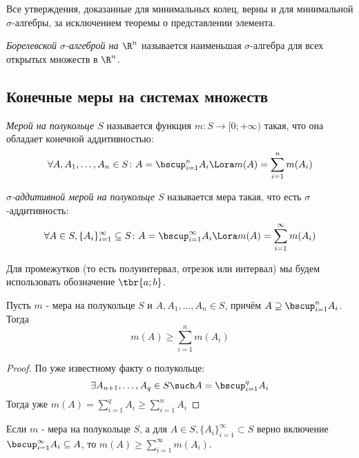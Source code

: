\begin{note}
	Все утверждения, доказанные для минимальных колец, верны и для минимальной $\sigma$-алгебры, за исключением теоремы о представлении элемента.
\end{note}

\begin{definition}
	\textit{Борелевской $\sigma$-алгеброй на $\R^n$} называется наименьшая $\sigma$-алгебра для всех открытых множеств в $\R^n$.
\end{definition}

\subsection{Конечные меры на системах множеств}

\begin{definition}
	\textit{Мерой на полукольце $S$} называется функция $m \colon S \to [0; +\infty)$ такая, что она обладает конечной аддитивностью:
	\[
		\forall A, A_1, \ldots, A_n \in S \colon A = \bscup_{i = 1}^n A_i \Lora m(A) = \sum_{i = 1}^n m(A_i)
	\]
\end{definition}

\begin{definition}
	\textit{$\sigma$-аддитивной мерой на полукольце $S$} называется мера такая, что есть $\sigma$-аддитивность:
	\[
		\forall A \in S, \{A_i\}_{i = 1}^\infty \subseteq S \colon A = \bscup_{i = 1}^\infty A_i \Lora m(A) = \sum_{i = 1}^\infty m(A_i)
	\]
\end{definition}

\begin{note}
	Для промежутков (то есть полуинтервал, отрезок или интервал) мы будем использовать обозначение $\tbr{a; b}$.
\end{note}

\begin{lemma}
	Пусть $m$ - мера на полукольце $S$ и $A, A_1, \ldots, A_n \in S$, причём $A \supseteq \bscup_{i = 1}^n A_i$. Тогда
	\[
		m(A) \ge \sum_{i = 1}^n m(A_i)
	\]
\end{lemma}

\begin{proof}
	По уже известному факту о полукольце:
	\[
		\exists A_{n + 1}, \ldots, A_q \in S \such A = \bscup_{i = 1}^q A_i
	\]
	Тогда уже $m(A) = \sum_{i = 1}^q A_i \ge \sum_{i = 1}^n A_i$
\end{proof}

\begin{corollary}
	Если $m$ - мера на полукольце $S$, а для $A \in S, \{A_i\}_{i = 1}^\infty \subset S$ верно включение $\bscup_{i = 1}^\infty A_i \subseteq A$, то $m(A) \ge \sum_{i = 1}^\infty m(A_i)$.
\end{corollary}

